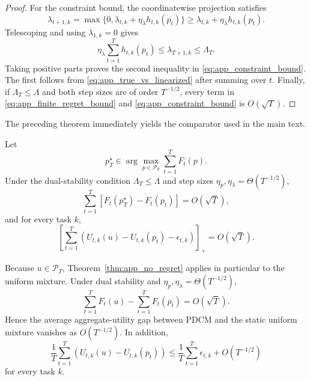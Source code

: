 \begin{proof}
For the constraint bound, the coordinatewise projection satisfies
\begin{equation}
    \lambda_{t+1,k}
    =
    \max\{0,\lambda_{t,k}+\eta_\lambda h_{t,k}(p_t)\}
    \ge
    \lambda_{t,k}+\eta_\lambda h_{t,k}(p_t).
\end{equation}
Telescoping and using $\lambda_{1,k}=0$ gives
\begin{equation}
    \eta_\lambda\sum_{t=1}^T h_{t,k}(p_t)
    \le
    \lambda_{T+1,k}
    \le
    \Lambda_T.
\end{equation}
Taking positive parts proves the second inequality in \eqref{eq:app_constraint_bound}. The first follows from \eqref{eq:app_true_vs_linearized} after summing over $t$. Finally, if $\Lambda_T\le\Lambda$ and both step sizes are of order $T^{-1/2}$, every term in \eqref{eq:app_finite_regret_bound} and \eqref{eq:app_constraint_bound} is $O(\sqrt{T})$.
\end{proof}

The preceding theorem immediately yields the comparator used in the main text.

\begin{corollary}
\label{cor:app_best_fixed}
Let
\begin{equation}
    p_T^\star
    \in
    \arg\max_{p\in\mathcal{P}_T}
    \sum_{t=1}^T F_t(p).
    \label{eq:app_best_fixed}
\end{equation}
Under the dual-stability condition $\Lambda_T\le\Lambda$ and step sizes $\eta_p,\eta_\lambda=\Theta(T^{-1/2})$,
\begin{equation}
    \sum_{t=1}^T
    \left[F_t(p_T^\star)-F_t(p_t)\right]
    =O(\sqrt{T}),
    \label{eq:app_best_fixed_regret}
\end{equation}
and for every task $k$,
\begin{equation}
    \left[
        \sum_{t=1}^T
        \left(
            U_{t,k}(u)-U_{t,k}(p_t)-\epsilon_{t,k}
        \right)
    \right]_+
    =O(\sqrt{T}).
    \label{eq:app_best_fixed_constraint}
\end{equation}
\end{corollary}

\begin{corollary}
\label{cor:app_uniform}
Because $u\in\mathcal{P}_T$, Theorem~\ref{thm:app_no_regret} applies in particular to the uniform mixture. Under dual stability and $\eta_p,\eta_\lambda=\Theta(T^{-1/2})$,
\begin{equation}
    \sum_{t=1}^T F_t(u)
    -
    \sum_{t=1}^T F_t(p_t)
    =O(\sqrt{T}).
    \label{eq:app_uniform_regret}
\end{equation}
Hence the average aggregate-utility gap between PDCM and the static uniform mixture vanishes as $O(T^{-1/2})$. In addition,
\begin{equation}
    \frac{1}{T}\sum_{t=1}^T
    \left(U_{t,k}(u)-U_{t,k}(p_t)\right)
    \le
    \frac{1}{T}\sum_{t=1}^T\epsilon_{t,k}
    +O(T^{-1/2})
    \label{eq:app_uniform_lag}
\end{equation}
for every task $k$.
\end{corollary}

